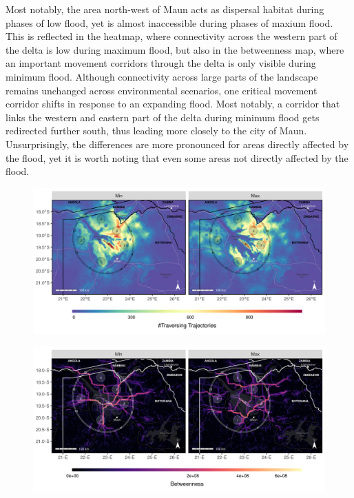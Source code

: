 \documentclass[abstract=on,10pt,a4paper,bibliography=totocnumbered]{article}
\begin{document}
 Most notably, the
area north-west of Maun acts as dispersal habitat during phases of low flood,
yet is almost inaccessible during phases of maxium flood. This is reflected in
the heatmap, where connectivity across the western part of the delta is low
during maximum flood, but also in the betweenness map, where an important
movement corridors through the delta is only visible during minimum flood.
Although connectivity across large parts of the landscape remains unchanged
across environmental scenarios, one critical movement corridor shifts in
response to an expanding flood. Most notably, a corridor that links the western
and eastern part of the delta during minimum flood gets redirected further
south, thus leading more closely to the city of Maun. Unsurprisingly, the
differences are more pronounced for areas directly affected by the flood, yet it
is worth noting that even some areas not directly affected by the flood.

\begin{figure}
  \begin{center}
  \includegraphics[width = \textwidth]{99_Heatmaps.png}
  \caption{}
  \label{Heatmaps}
  \end{center}
\end{figure}


\begin{figure}
  \begin{center}
  \includegraphics[width = \textwidth]{99_Betweenness.png}
  \caption{}
  \label{Betweenness}
  \end{center}
\end{figure}
\end{document}
